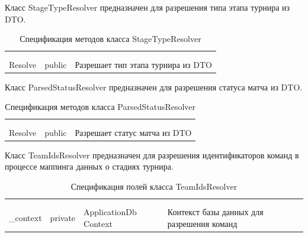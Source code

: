 Класс StageTypeResolver предназначен для разрешения типа этапа турнира из DTO.

\begin{xltabular}{\textwidth}{|X|X|X|}
	\caption{Спецификация методов класса StageTypeResolver}\label{table:StageTypeResolverMethods}\\ \hline
	 &  &  \\ \hline
	 &  &  \\ \hline
	\endfirsthead
	 \hline
	 &  &  \\ \hline
	\endhead
	Resolve & public & Разрешает тип этапа турнира из DTO \\ \hline
\end{xltabular}

Класс ParsedStatusResolver предназначен для разрешения статуса матча из DTO.

\begin{xltabular}{\textwidth}{|X|X|X|}
	\caption{Спецификация методов класса ParsedStatusResolver}\label{table:ParsedStatusResolverMethods}\\ \hline
	 &  &  \\ \hline
	 &  &  \\ \hline
	\endfirsthead
	 \hline
	 &  &  \\ \hline
	\endhead
	Resolve & public & Разрешает статус матча из DTO \\ \hline
\end{xltabular}

Класс TeamIdsResolver предназначен для разрешения идентификаторов команд в процессе маппинга данных о стадиях турнира.

\begin{xltabular}{\textwidth}{|X|X|X|X|}
	\caption{Спецификация полей класса TeamIdsResolver}\label{table:TeamIdsResolverFields}\\ \hline
	 &  &  &  \\ \hline
	 &  &  &  \\ \hline
	\endfirsthead
	 \hline
	 &  &  &  \\ \hline
	\endhead
	\_context & private & ApplicationDb
	Context & Контекст базы данных для разрешения команд \\ \hline
\end{xltabular}

